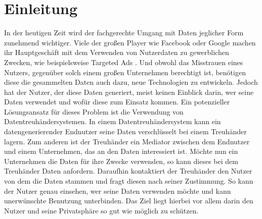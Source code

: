 \documentclass{scrreprt}
\begin{document}
\chapter{Einleitung}
\label{chap:intro}
In der heutigen Zeit wird der fachgerechte Umgang mit Daten jeglicher Form zunehmend wichtiger. Viele der großen Player wie Facebook oder Google machen ihr Hauptgeschäft mit dem Verwenden von Nutzerdaten zu gewerblichen Zwecken, wie beispielsweise Targeted Ads \cite{facebookad,googlead}. Und obwohl das Misstrauen eines Nutzers, gegenüber solch einem großen Unternehmen  berechtigt ist, benötigen diese die gesammelten Daten auch dazu, neue Technologien zu entwickeln. Jedoch hat der Nutzer, der diese Daten generiert, meist keinen Einblick darin, wer seine Daten verwendet und wofür diese zum Einsatz kommen. Ein potenzieller Lösungsansatz für dieses Problem ist die Verwendung von Datentreuhändersystemen. In einem Datentreuhändersystem kann ein datengenerierender Endnutzer seine Daten verschlüsselt bei einem Treuhänder lagern. Zum anderen ist der Treuhänder ein Mediator zwischen dem Endnutzer und einem Unternehmen, das an den Daten interessiert ist. Möchte nun ein Unternehmen die Daten für ihre Zwecke verwenden, so kann dieses bei dem Treuhänder Daten anfordern. Daraufhin kontaktiert der Treuhänder den Nutzer von dem die Daten stammen und fragt diesen nach seiner Zustimmung. So kann der Nutzer genau einsehen, wer seine Daten verwenden möchte und kann unerwünschte Benutzung unterbinden. Das Ziel liegt hierbei vor allem darin den Nutzer und seine Privatsphäre so gut wie möglich zu schützen.
\end{document}

